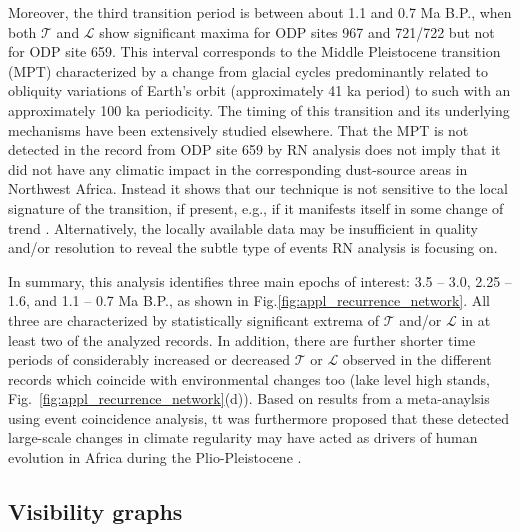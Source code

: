 		Moreover, the third transition period is between about 1.1 and 0.7 Ma B.P., when both $\mathcal{T}$ and $\mathcal{L}$ show significant maxima for ODP sites 967 and 721/722 but not for ODP site 659. This interval corresponds to the Middle Pleistocene transition (MPT) characterized by a change from glacial cycles predominantly related to obliquity variations of Earth's orbit (approximately 41 ka period) to such with an approximately 100 ka periodicity. The timing of this transition and its underlying mechanisms have been extensively studied elsewhere. That the MPT is not detected in the record from ODP site 659 by RN analysis does not imply that it did not have any climatic impact in the corresponding dust-source areas in Northwest Africa. Instead it shows that our technique is not sensitive to the local signature of the transition, if present, e.g., if it manifests itself in some change of trend \cite{Donges2011a}. Alternatively, the locally available data may be insufficient in quality and/or resolution to reveal the subtle type of events RN analysis is focusing on.

		In summary, this analysis identifies three main epochs of interest: 3.5 -- 3.0, 2.25 -- 1.6, and 1.1 -- 0.7 Ma B.P., as shown in Fig.\ref{fig:appl_recurrence_network}. All three are characterized by statistically significant extrema of $\mathcal{T}$ and/or $\mathcal{L}$ in at least two of the analyzed records. In addition, there are further shorter time periods of considerably increased or decreased $\mathcal{T}$ or $\mathcal{L}$ observed in the different records which coincide with environmental changes too (lake level high stands, Fig.~\ref{fig:appl_recurrence_network}(d)). Based on results from a meta-anaylsis using event coincidence analysis, tt was furthermore proposed that these detected large-scale changes in climate regularity may have acted as drivers of human evolution in Africa during the Plio-Pleistocene \cite{Donges2011a}.


	\subsection{Visibility graphs} \label{sec:appVGs}

